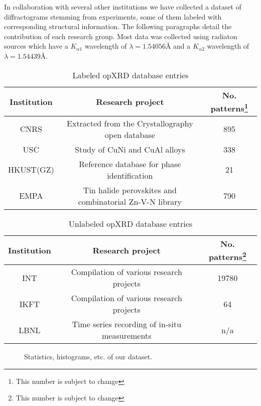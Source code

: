 In collaboration with several other institutions we have collected a dataset of diffractograms stemming from experiments, some of them labeled with corresponding structural information. The following paragraphs detail the contribution of each research group. Most data was collected using  radiaton sources which have a  $K_{\alpha1}$ wavelength of $\lambda=1.54056\text{\AA}$ and a $K_{\alpha2}$ wavelength of $\lambda=1.54439\text{\AA}$.

\begin{table}[!htb]
\centering
\caption{Labeled opXRD database entries}
\label{tab:labeled}
\begin{tabular}{@{}ccc@{}} %
\toprule
Institution & Research project & No. patterns\footnote{This number is subject to change} \\
\midrule
CNRS        & Extracted from the Crystallography open database & 895 \\
USC         & Study of CuNi and CuAl alloys & 338 \\
HKUST(GZ)   & Reference database for phase identification & 21 \\
EMPA        & Tin halide perovskites and combinatorial Zn-V-N library & 790 \\
\bottomrule
\end{tabular}
\end{table}

\begin{table}[!htb]
\centering
\caption{Unlabeled opXRD database entries}
\label{tab:unlabeled}
\begin{tabular}{@{}ccc@{}} %
\toprule
Institution & Research project & No. patterns\footnote{This number is subject to change} \\
\midrule
INT         & Compilation of various research projects & 19780 \\
IKFT        & Compilation of various research projects & 64 \\
LBNL        & Time series recording of in-situ measurements & n/a \\
\bottomrule
\end{tabular}
\end{table}


\begin{figure*}[!ht]
    \centering
    \missingfigure{} 
    \caption{Statistics, histograms, etc. of our dataset.}
    \label{fig:statistics}
\end{figure*}


